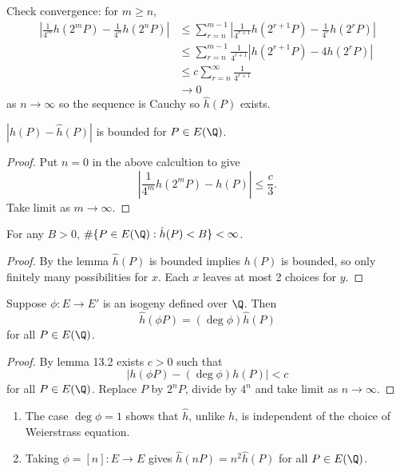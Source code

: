 \documentclass[a4paper]{article}
\theoremstyle{definition}
\theoremstyle{theorem}
\begin{document}
Check convergence: for \(m \geq n\),
\begin{align*}
  |\frac{1}{4^m} h(2^m P) - \frac{1}{4^n} h(2^n P)|
  &\leq \sum_{r = n}^{m - 1} |\frac{1}{4^{r + 1}} h(2^{r + 1}P) - \frac{1}{4^r} h(2^r P)| \\
  &\leq \sum_{r = n}^{m - 1} \frac{1}{4^{r + 1}} |h(2^{r + 1}P) - 4h(2^r P)| \\
  &\leq c \sum_{r = n}^\infty \frac{1}{4^{r + 1}} \\
  &\to 0
\end{align*}
as \(n \to \infty\) so the sequence is Cauchy so \(\hat h(P)\) exists.

\begin{lemma}
  \(|h(P) - \hat h(P)|\) is bounded for \(P \in E(\Q)\).
\end{lemma}

\begin{proof}
  Put \(n = 0\) in the above calcultion to give
  \[
    |\frac{1}{4^m} h(2^m P) - h(P)| \leq \frac{c}{3}.
  \]
  Take limit as \(m \to \infty\).
\end{proof}

\begin{corollary}
  For any \(B > 0\), \(\# \{P \in E(\Q): \hat h(P) < B\} < \infty\).
\end{corollary}

\begin{proof}
  By the lemma \(\hat h(P)\) is bounded implies \(h(P)\) is bounded, so only finitely many possibilities for \(x\). Each \(x\) leaves at most 2 choices for \(y\).
\end{proof}

\begin{lemma}
  Suppose \(\phi: E \to E'\) is an isogeny defined over \(\Q\). Then
  \[
    \hat h(\phi P) = (\deg \phi) \hat h(P)
  \]
  for all \(P \in E(\Q)\).
\end{lemma}

\begin{proof}
  By lemma 13.2 exists \(c > 0\) such that
  \[
    |h(\phi P) - (\deg \phi) h(P)| < c
  \]
  for all \(P \in E(\Q)\). Replace \(P\) by \(2^nP\), divide by \(4^n\) and take limit as \(n \to \infty\).
\end{proof}

\begin{remark}\leavevmode
  \begin{enumerate}
  \item The case \(\deg \phi = 1\) shows that \(\hat h\), unlike \(h\), is independent of the choice of Weierstrass equation.
  \item Taking \(\phi = [n]: E \to E\) gives \(\hat h(nP) = n^2 \hat h(P)\) for all \(P \in E(\Q)\).
  \end{enumerate}
\end{remark}
\end{document}

